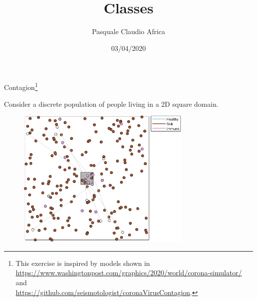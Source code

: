 \documentclass[10pt]{beamer}
\begin{document}
    \title{Classes}
    \author{Pasquale Claudio Africa}
    \date{03/04/2020}
    
\begin{frame}
    \maketitle
\end{frame}

\begin{frame}{Contagion\footnote{This exercise is inspired by models shown in \\
\url{https://www.washingtonpost.com/graphics/2020/world/corona-simulator/} and \\
\url{https://github.com/seismotologist/coronaVirusContagion}.}}

Consider a discrete population of people living in a 2D square domain.

\begin{figure}
    \includegraphics[width=0.75\textwidth]{contagion.png}
\end{figure}
\end{frame}
\end{document}
